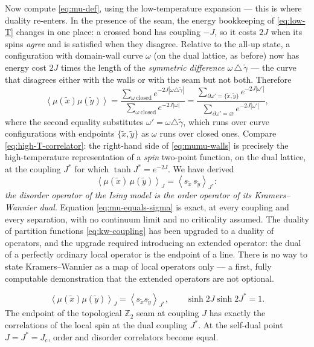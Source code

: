 Now compute \eqref{eq:mu-def}, using the low-temperature expansion ---
this is where duality re-enters. In the presence of the seam, the energy
bookkeeping of \eqref{eq:low-T} changes in one place: a crossed bond has
coupling $-J$, so it costs $2J$ when its spins \emph{agree} and is
satisfied when they disagree. Relative to the all-up state, a configuration with
domain-wall curve $\omega$ (on the dual lattice, as before) now has
energy cost $2J$ times the length of the \emph{symmetric difference}
$\omega \,\triangle\, \tilde\gamma$ --- the curve that disagrees either
with the walls or with the seam but not both. Therefore
\begin{equation}
\left\langle \mu(\tilde x) \mu(\tilde y)\right\rangle
= \frac{\sum_{\omega\ \mathrm{closed}} e^{-2J\left|\omega \triangle
\tilde\gamma\right|}}{\sum_{\omega\ \mathrm{closed}} e^{-2J|\omega|}}
= \frac{\sum_{\partial\omega' = \{\tilde x, \tilde y\}}
e^{-2J|\omega'|}}{\sum_{\partial\omega' = \varnothing} e^{-2J|\omega'|}},
\label{eq:mumu-walls}
\end{equation}
where the second equality substitutes $\omega' = \omega \triangle
\tilde\gamma$, which runs over curve configurations with endpoints
$\{\tilde x, \tilde y\}$ as $\omega$ runs over closed ones. Compare
\eqref{eq:high-T-correlator}: the right-hand side of
\eqref{eq:mumu-walls} is precisely the high-temperature representation of
a \emph{spin} two-point function, on the dual lattice, at the coupling
$J^*$ for which $\tanh J^* = e^{-2J}$. We have derived
\begin{equation}
\left\langle \mu(\tilde x)\, \mu(\tilde y) \right\rangle_{J}
= \left\langle s_{\tilde x}\, s_{\tilde y} \right\rangle_{J^*} :
\label{eq:mu-equals-sigma}
\end{equation}
\emph{the disorder operator of the Ising model is the order operator of
its Kramers--Wannier dual}. Equation \eqref{eq:mu-equals-sigma} is exact,
at every coupling and every separation, with no continuum limit and no
criticality assumed. The duality of partition functions
\eqref{eq:kw-coupling} has been upgraded to a duality of operators, and
the upgrade required introducing an extended operator: the dual of a
perfectly ordinary local operator is the endpoint of a line. There is no
way to state Kramers--Wannier as a map of local operators only --- a
first, fully computable demonstration that the extended operators are
not optional.

\begin{eequation}
\label{eq:kw-box}
\begin{equation*}
\left\langle \mu(\tilde x) \mu(\tilde y) \right\rangle_{J}
= \left\langle s_{\tilde x} s_{\tilde y} \right\rangle_{J^*},
\qquad \sinh 2J \sinh 2J^* = 1 .
\end{equation*}
The endpoint of the topological $\mathbb{Z}_2$ seam at coupling $J$ has exactly
the correlations of the local spin at the dual coupling $J^*$. At the
self-dual point $J = J^* = J_c$, order and disorder correlators become
equal.
\end{eequation}

